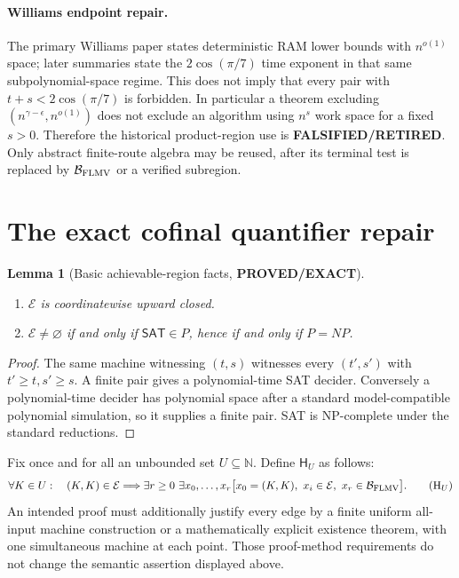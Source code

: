 \documentclass[11pt]{article}
\newtheorem{lemma}{Lemma}
\newcommand{\SAT}{\mathsf{SAT}}
\newcommand{\EE}{\mathcal E}
\newcommand{\BB}{\mathcal B_{\rm FLMV}}
\newcommand{\EXACT}{\textbf{PROVED/EXACT}}
\newcommand{\RET}{\textbf{FALSIFIED/RETIRED}}
\begin{document}
\paragraph{Williams endpoint repair.}
The primary Williams paper states deterministic RAM lower bounds with
$n^{o(1)}$ space; later summaries state the $2\cos(\pi/7)$ time exponent in
that same subpolynomial-space regime.  This does not imply that every pair
with $t+s<2\cos(\pi/7)$ is forbidden.  In particular a theorem excluding
$(n^{\gamma-\epsilon},n^{o(1)})$ does not exclude an algorithm using
$n^s$ work space for a fixed $s>0$.  Therefore the historical product-region
use is \RET.  Only abstract finite-route algebra may be reused, after its
terminal test is replaced by $\BB$ or a verified subregion.

\section{The exact cofinal quantifier repair}

\begin{lemma}[Basic achievable-region facts, \EXACT]
\begin{enumerate}
\item $\EE$ is coordinatewise upward closed.
\item $\EE\ne\varnothing$ if and only if $\SAT\in P$, hence if and only if
$P=NP$.
\end{enumerate}
\end{lemma}
\begin{proof}
The same machine witnessing $(t,s)$ witnesses every $(t',s')$ with
$t'\ge t,s'\ge s$.  A finite pair gives a polynomial-time SAT decider.
Conversely a polynomial-time decider has polynomial space after a standard
model-compatible polynomial simulation, so it supplies a finite pair.  SAT
is NP-complete under the standard reductions.
\end{proof}

Fix once and for all an unbounded set $U\subseteq\mathbb N$.  Define
$\mathsf H_U$ as follows:
\[
 \forall K\in U:\quad (K,K)\in\EE\Longrightarrow
 \exists r\ge0\ \exists x_0,\ldots,x_r
 \bigl[x_0=(K,K),\ x_i\in\EE,\ x_r\in\BB\bigr].
\tag{H$_U$}
\]
An intended proof must additionally justify every edge by a finite uniform
all-input machine construction or a mathematically explicit existence
theorem, with one simultaneous machine at each point.  Those proof-method
requirements do not change the semantic assertion displayed above.
\end{document}
